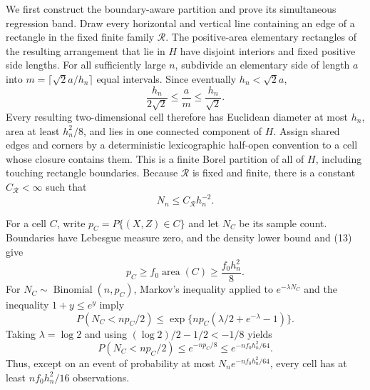 We first construct the boundary-aware partition and prove its simultaneous regression band. Draw every horizontal and vertical line containing an edge of a rectangle in the fixed finite family \(\mathscr R\). The positive-area elementary rectangles of the resulting arrangement that lie in \(H\) have disjoint interiors and fixed positive side lengths. For all sufficiently large \(n\), subdivide an elementary side of length \(a\) into
\(
 m=\lceil\sqrt2a/h_n\rceil
\)
equal intervals. Since eventually \(h_n<\sqrt2a\),
\[
 \frac{h_n}{2\sqrt2}\leq\frac{a}{m}\leq\frac{h_n}{\sqrt2}.       \tag{13}
\]
Every resulting two-dimensional cell therefore has Euclidean diameter at most \(h_n\), area at least \(h_n^2/8\), and lies in one connected component of \(H\). Assign shared edges and corners by a deterministic lexicographic half-open convention to a cell whose closure contains them. This is a finite Borel partition of all of \(H\), including touching rectangle boundaries. Because \(\mathscr R\) is fixed and finite, there is a constant \(C_{\mathscr R}<\infty\) such that
\[
 N_n\leq C_{\mathscr R}h_n^{-2}.                                 \tag{14}
\]

For a cell \(C\), write \(p_C=P\{(X,Z)\in C\}\) and let \(N_C\) be its sample count. Boundaries have Lebesgue measure zero, and the density lower bound and (13) give
\[
 p_C\geq f_0\operatorname{area}(C)\geq\frac{f_0h_n^2}{8}.         \tag{15}
\]
For \(N_C\sim\operatorname{Binomial}(n,p_C)\), Markov's inequality applied to \(e^{-\lambda N_C}\) and the inequality \(1+y\leq e^y\) imply
\[
 P(N_C<np_C/2)
 \leq\exp\{np_C(\lambda/2+e^{-\lambda}-1)\}.
\]
Taking \(\lambda=\log2\) and using \((\log2)/2-1/2<-1/8\) yields
\[
 P(N_C<np_C/2)\leq e^{-np_C/8}\leq e^{-nf_0h_n^2/64}.            \tag{16}
\]
Thus, except on an event of probability at most \(N_ne^{-nf_0h_n^2/64}\), every cell has at least \(nf_0h_n^2/16\) observations.

